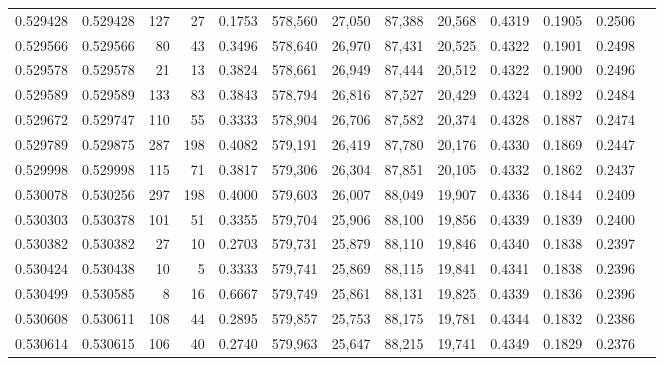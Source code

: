 \begin{tabular}{rrrrrrrrrrrrr}
0.529428 & 0.529428 &   127 &    27 &                                     0.1753 & 578,560 &  27,050 &  87,388 &  20,568 & 0.4319 & 0.1905 & 0.2506 \\
0.529566 & 0.529566 &    80 &    43 &                                     0.3496 & 578,640 &  26,970 &  87,431 &  20,525 & 0.4322 & 0.1901 & 0.2498 \\
0.529578 & 0.529578 &    21 &    13 &                                     0.3824 & 578,661 &  26,949 &  87,444 &  20,512 & 0.4322 & 0.1900 & 0.2496 \\
0.529589 & 0.529589 &   133 &    83 &                                     0.3843 & 578,794 &  26,816 &  87,527 &  20,429 & 0.4324 & 0.1892 & 0.2484 \\
0.529672 & 0.529747 &   110 &    55 &                                     0.3333 & 578,904 &  26,706 &  87,582 &  20,374 & 0.4328 & 0.1887 & 0.2474 \\
0.529789 & 0.529875 &   287 &   198 &                                     0.4082 & 579,191 &  26,419 &  87,780 &  20,176 & 0.4330 & 0.1869 & 0.2447 \\
0.529998 & 0.529998 &   115 &    71 &                                     0.3817 & 579,306 &  26,304 &  87,851 &  20,105 & 0.4332 & 0.1862 & 0.2437 \\
0.530078 & 0.530256 &   297 &   198 &                                     0.4000 & 579,603 &  26,007 &  88,049 &  19,907 & 0.4336 & 0.1844 & 0.2409 \\
0.530303 & 0.530378 &   101 &    51 &                                     0.3355 & 579,704 &  25,906 &  88,100 &  19,856 & 0.4339 & 0.1839 & 0.2400 \\
0.530382 & 0.530382 &    27 &    10 &                                     0.2703 & 579,731 &  25,879 &  88,110 &  19,846 & 0.4340 & 0.1838 & 0.2397 \\
0.530424 & 0.530438 &    10 &     5 &                                     0.3333 & 579,741 &  25,869 &  88,115 &  19,841 & 0.4341 & 0.1838 & 0.2396 \\
0.530499 & 0.530585 &     8 &    16 &                                     0.6667 & 579,749 &  25,861 &  88,131 &  19,825 & 0.4339 & 0.1836 & 0.2396 \\
0.530608 & 0.530611 &   108 &    44 &                                     0.2895 & 579,857 &  25,753 &  88,175 &  19,781 & 0.4344 & 0.1832 & 0.2386 \\
0.530614 & 0.530615 &   106 &    40 &                                     0.2740 & 579,963 &  25,647 &  88,215 &  19,741 & 0.4349 & 0.1829 & 0.2376 \\

\end{tabular}
